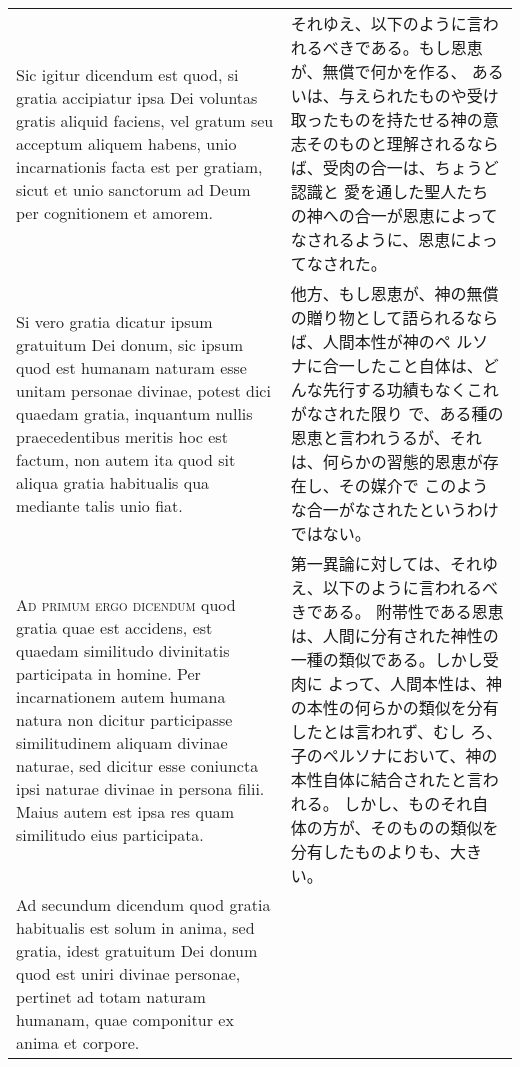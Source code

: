 \documentclass[10pt]{jsarticle} %
\begin{document}
\begin{longtable}{p{21em}p{21em}}
\\


Sic
igitur dicendum est quod, si gratia accipiatur ipsa Dei voluntas gratis
aliquid faciens, vel gratum seu acceptum aliquem habens, unio
incarnationis facta est per gratiam, sicut et unio sanctorum ad Deum per
cognitionem et amorem. 

&

それゆえ、以下のように言われるべきである。もし恩恵が、無償で何かを作る、
 あるいは、与えられたものや受け取ったものを持たせる神の意志そのものと理解されるならば、受肉の合一は、ちょうど認識と
 愛を通した聖人たちの神への合一が恩恵によってなされるように、恩恵によっ
 てなされた。


\\

Si vero gratia dicatur ipsum gratuitum Dei donum,
sic ipsum quod est humanam naturam esse unitam personae divinae, potest
dici quaedam gratia, inquantum nullis praecedentibus meritis hoc est
factum, non autem ita quod sit aliqua gratia habitualis qua mediante
talis unio fiat.

&

他方、もし恩恵が、神の無償の贈り物として語られるならば、人間本性が神のペ
 ルソナに合一したこと自体は、どんな先行する功績もなくこれがなされた限り
 で、ある種の恩恵と言われうるが、それは、何らかの習態的恩恵が存在し、その媒介で
 このような合一がなされたというわけではない。

\\



{\scshape Ad primum ergo dicendum} quod gratia quae est accidens, est quaedam
similitudo divinitatis participata in homine. Per incarnationem autem
humana natura non dicitur participasse similitudinem aliquam divinae
naturae, sed dicitur esse coniuncta ipsi naturae divinae in persona
filii. Maius autem est ipsa res quam similitudo eius participata.

&

第一異論に対しては、それゆえ、以下のように言われるべきである。
附帯性である恩恵は、人間に分有された神性の一種の類似である。しかし受肉に
 よって、人間本性は、神の本性の何らかの類似を分有したとは言われず、むし
 ろ、子のペルソナにおいて、神の本性自体に結合されたと言われる。
しかし、ものそれ自体の方が、そのものの類似を分有したものよりも、大きい。

\\



Ad secundum dicendum quod gratia habitualis est solum in anima, sed
gratia, idest gratuitum Dei donum quod est uniri divinae personae,
pertinet ad totam naturam humanam, quae componitur ex anima et
corpore. 


\end{longtable}
\end{document}

